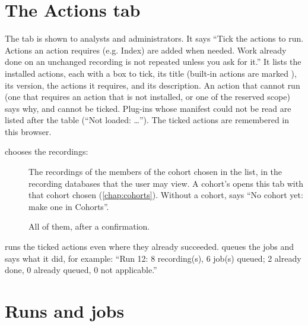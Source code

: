 \section{The Actions tab}
\label{sec:actions-tab}

The  tab is shown to analysts and administrators. It says ``Tick the actions to run.
Actions an action requires (e.g. Index) are added when needed. Work already done on an unchanged
recording is not repeated unless you ask for it.'' It lists the installed actions,
each with a box to tick, its title (built-in actions are marked ), its version, the
actions it requires, and its description. An action that cannot run (one that requires an action
that is not installed, or one of the reserved  scope) says why, and cannot be
ticked. Plug-ins whose manifest could not be read are listed after the table (``Not loaded:
\dots''). The ticked actions are remembered in this browser.

 chooses the recordings:
\begin{description}
\item[] The recordings of the members of the cohort
  chosen in the list, in the recording databases that the user may view. A cohort's  opens this tab with that cohort chosen (\cref{chap:cohorts}). Without a cohort,
   says ``No cohort yet: make one in Cohorts''.
\item[] All of them, after a confirmation.
\end{description}
 runs the ticked actions even where they already succeeded.
 queues the jobs and says what it did, for example: ``Run 12: 8 recording(s), 6 job(s)
queued; 2 already done, 0 already queued, 0 not applicable.''

\section{Runs and jobs}
\label{sec:actions-runs}

